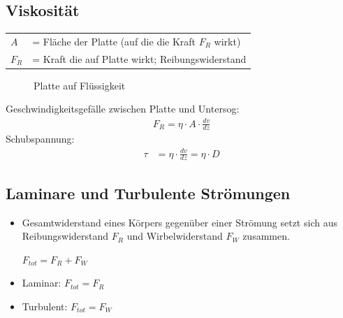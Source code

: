 \documentclass[a4paper,11pt,twoside]{article}
\begin{document}
\vfill

\subsection{Viskosität}
\begin{tabular}{ll}
$A$ &= Fläche der Platte (auf die die Kraft $F_R$ wirkt)\\
$F_R$ &= Kraft die auf Platte wirkt; Reibungswiderstand \\
 
\end{tabular}
\pp
\begin{figure}[h]
\centering
{}
\caption{Platte auf Flüssigkeit}
\end{figure}
\pp
Geschwindigkeitsgefälle zwischen Platte und Untersog:
\begin{align*}
F_R = \eta \cdot A \cdot \frac{dv}{dz}
\end{align*}
Schubspannung:
\begin{align*}
\tau &= \eta \cdot \frac{dv}{dz} = \eta \cdot D
\end{align*}














\subsection{Laminare und Turbulente Strömungen}
\begin{itemize}
\item Gesamtwiderstand eines Körpers gegenüber einer Strömung setzt sich aus Reibungswiderstand $F_R$ und Wirbelwiderstand $F_W$ zusammen. \par 
\begin{center}
$F_{tot} = F_R + F_W$ 
\end{center}
\item Laminar: $F_{tot} = F_R$
\item Turbulent: $F_{tot} = F_W$

\end{itemize}
\pp
\end{document}
